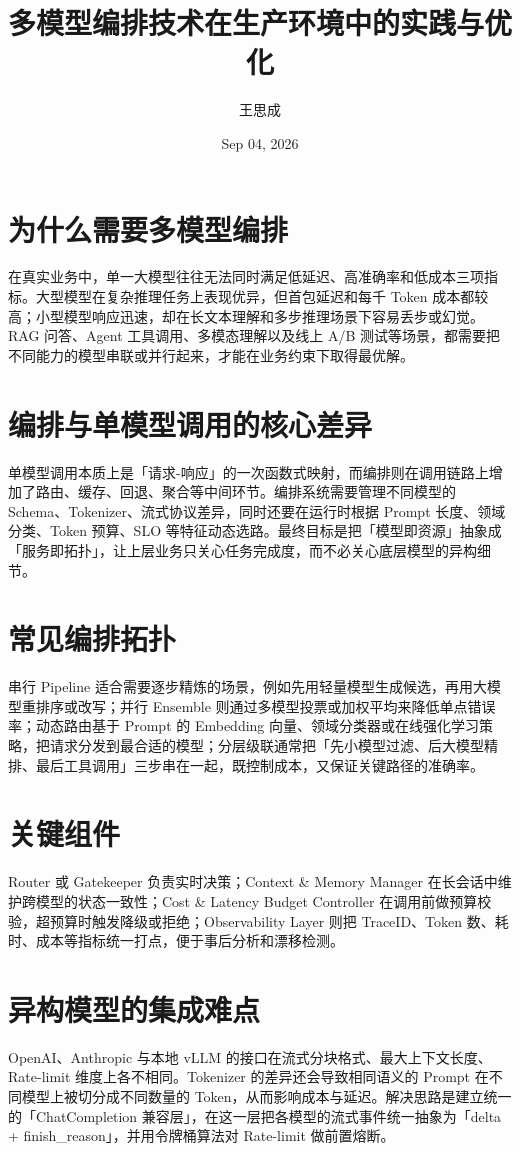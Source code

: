 \title{多模型编排技术在生产环境中的实践与优化}
\author{王思成}
\date{Sep 04, 2026}
\maketitle
\chapter{为什么需要多模型编排}
在真实业务中，单一大模型往往无法同时满足低延迟、高准确率和低成本三项指标。大型模型在复杂推理任务上表现优异，但首包延迟和每千 Token 成本都较高；小型模型响应迅速，却在长文本理解和多步推理场景下容易丢步或幻觉。RAG 问答、Agent 工具调用、多模态理解以及线上 A/B 测试等场景，都需要把不同能力的模型串联或并行起来，才能在业务约束下取得最优解。\par
\chapter{编排与单模型调用的核心差异}
单模型调用本质上是「请求-响应」的一次函数式映射，而编排则在调用链路上增加了路由、缓存、回退、聚合等中间环节。编排系统需要管理不同模型的 Schema、Tokenizer、流式协议差异，同时还要在运行时根据 Prompt 长度、领域分类、Token 预算、SLO 等特征动态选路。最终目标是把「模型即资源」抽象成「服务即拓扑」，让上层业务只关心任务完成度，而不必关心底层模型的异构细节。\par
\chapter{常见编排拓扑}
串行 Pipeline 适合需要逐步精炼的场景，例如先用轻量模型生成候选，再用大模型重排序或改写；并行 Ensemble 则通过多模型投票或加权平均来降低单点错误率；动态路由基于 Prompt 的 Embedding 向量、领域分类器或在线强化学习策略，把请求分发到最合适的模型；分层级联通常把「先小模型过滤、后大模型精排、最后工具调用」三步串在一起，既控制成本，又保证关键路径的准确率。\par
\chapter{关键组件}
Router 或 Gatekeeper 负责实时决策；Context \&{} Memory Manager 在长会话中维护跨模型的状态一致性；Cost \&{} Latency Budget Controller 在调用前做预算校验，超预算时触发降级或拒绝；Observability Layer 则把 TraceID、Token 数、耗时、成本等指标统一打点，便于事后分析和漂移检测。\par
\chapter{异构模型的集成难点}
OpenAI、Anthropic 与本地 vLLM 的接口在流式分块格式、最大上下文长度、Rate-limit 维度上各不相同。Tokenizer 的差异还会导致相同语义的 Prompt 在不同模型上被切分成不同数量的 Token，从而影响成本与延迟。解决思路是建立统一的「ChatCompletion 兼容层」，在这一层把各模型的流式事件统一抽象为「delta + finish\_{}reason」，并用令牌桶算法对 Rate-limit 做前置熔断。\par
